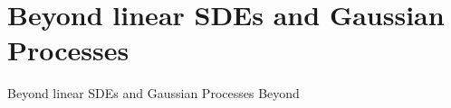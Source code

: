 \section{Beyond linear SDEs and Gaussian Processes}\label{beyond}

\begin{frame}{Beyond linear SDEs and Gaussian Processes}
    Beyond
\end{frame}